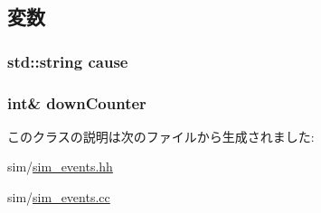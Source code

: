 \subsection{変数}
\hypertarget{classCountedExitEvent_ae4eec0077e30624726ddd2a0947962e5}{
\subsubsection[{cause}]{\setlength{\rightskip}{0pt plus 5cm}std::string {\bf cause}}}
\label{classCountedExitEvent_ae4eec0077e30624726ddd2a0947962e5}
\hypertarget{classCountedExitEvent_a5b3286721a949c321dee6a7a21f22748}{
\subsubsection[{downCounter}]{\setlength{\rightskip}{0pt plus 5cm}int\& {\bf downCounter}}}
\label{classCountedExitEvent_a5b3286721a949c321dee6a7a21f22748}


このクラスの説明は次のファイルから生成されました:\begin{DoxyCompactItemize}
\item 
sim/\hyperlink{sim__events_8hh}{sim\_\-events.hh}\item 
sim/\hyperlink{sim__events_8cc}{sim\_\-events.cc}\end{DoxyCompactItemize}
